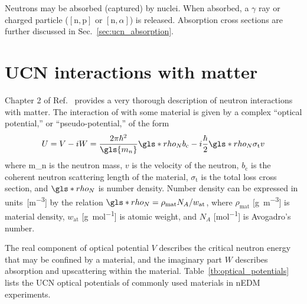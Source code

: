 Neutrons may be absorbed (captured) by nuclei. When absorbed, a $\gamma$ ray or charged particle ($[\text{n},\text{p}]$ or $[\text{n},\alpha]$) is released. Absorption cross sections are further discussed in Sec.~\ref{sec:ucn_absorption}.


\section{UCN interactions with matter}\label{sec:ucn_matter_int}


Chapter 2 of Ref.~\cite{golubUCN} provides a very thorough description of neutron interactions with matter. The interaction of \ucn with some material is given by a complex ``optical potential,'' or ``pseudo-potential,'' of the form
%
\begin{gather}
    U = V - iW = \frac{2\pi\hbar^2}{\gls{m_n}}\gls*{rho_N} b_\text{c}-i\frac{\hbar}{2}\gls*{rho_N} \sigma_{\text{t}} v \label{eq:optical_potential}
\end{gather}
%
where \gls{m_n} is the neutron mass, $v$ is the velocity of the neutron, $b_\text{c}$ is the coherent neutron scattering length of the material, $\sigma_{\text{t}}$ is the total loss cross section, and $\gls*{rho_N}$ is number density. Number density can be expressed in units~[\unit{\meter^{-3}}] by the relation $\gls*{rho_N}=\rho_\text{mat}N_A/w_\text{at}$, where $\rho_\text{mat}$ [\unit{\g\per\m^3}] is material density, $w_\text{at}$ [\unit{\g\per\mole}] is atomic weight, and $N_A$ [\unit{\mole^{-1}}] is Avogadro's number.

The real component of optical potential $V$ describes the critical neutron energy that may be confined by a material, and the imaginary part $W$ describes absorption and upscattering within the material. Table~\ref{tb:optical_potentials} lists the UCN optical potentials of commonly used materials in nEDM experiments.

